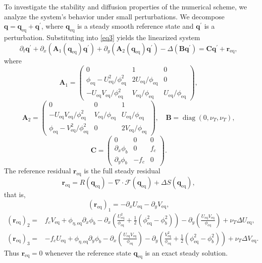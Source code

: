 \documentclass[pdflatex,sn-mathphys-num]{sn-jnl}%
\theoremstyle{thmstyleone}%
\theoremstyle{thmstyletwo}%
\theoremstyle{thmstylethree}%
\begin{document}
To investigate the stability and diffusion properties of the numerical scheme, we analyze the system's behavior under small perturbations. We decompose $\mathbf{q}=\mathbf{q}_{\mathrm{eq}}+\mathbf{q}^\prime$, where $\mathbf{q}_{\mathrm{eq}}$ is a steady smooth reference state and $\mathbf{q}^\prime$ is a perturbation. Substituting into \eqref{eq3} yields the linearized system
\begin{equation}\label{eq12}
\partial_t \mathbf{q}^{\prime}+\partial_x\left(\mathbf{A}_1(\mathbf{q}_{\mathrm{eq}}) \mathbf{q}^{\prime}\right)+\partial_y\left(\mathbf{A}_2(\mathbf{q}_{\mathrm{eq}}) \mathbf{q}^{\prime}\right)-\Delta(\mathbf{B} \mathbf{q}^{\prime}) = \mathbf{C} \mathbf{q}^{\prime}+\mathbf{r}_{\mathrm{eq}} ,
\end{equation}
where
\[
\mathbf A_1=
\begin{pmatrix}
0&1&0\\
\phi_{\mathrm{eq}}-U_{\mathrm{eq}}^2/\phi_{\mathrm{eq}}^2&2U_{\mathrm{eq}}/\phi_{\mathrm{eq}}&0\\
-U_{\mathrm{eq}}V_{\mathrm{eq}}/\phi_{\mathrm{eq}}^2&V_{\mathrm{eq}}/\phi_{\mathrm{eq}}&U_{\mathrm{eq}}/\phi_{\mathrm{eq}}
\end{pmatrix},
\]
\[
\mathbf A_2=
\begin{pmatrix}
0&0&1\\
-U_{\mathrm{eq}}V_{\mathrm{eq}}/\phi_{\mathrm{eq}}^2&V_{\mathrm{eq}}/\phi_{\mathrm{eq}}&U_{\mathrm{eq}}/\phi_{\mathrm{eq}}\\
\phi_{\mathrm{eq}}-V_{\mathrm{eq}}^2/\phi_{\mathrm{eq}}^2&0&2V_{\mathrm{eq}}/\phi_{\mathrm{eq}}
\end{pmatrix},
\quad
\mathbf B=\operatorname{diag}(0,\nu_T,\nu_T),
\]
\[
\mathbf C=
\begin{pmatrix}
0&0&0\\
\partial_x\phi_b&0&f_c\\
\partial_y\phi_b&-f_c&0
\end{pmatrix}.
\]
The reference residual $\mathbf r_{\mathrm{eq}}$ is the full steady residual
\begin{equation}
\label{eq:reference-residual}
\mathbf r_{\mathrm{eq}}
=R(\mathbf q_{\mathrm{eq}})-\nabla\cdot\mathcal F(\mathbf q_{\mathrm{eq}})
+\Delta S(\mathbf q_{\mathrm{eq}}),
\end{equation}
that is,
\[
(\mathbf r_{\mathrm{eq}})_1=-\partial_xU_{\mathrm{eq}}-\partial_yV_{\mathrm{eq}},
\]
\[
\begin{aligned}
(\mathbf r_{\mathrm{eq}})_2={}&f_cV_{\mathrm{eq}}+\phi_{\eta,\mathrm{eq}}\partial_x\phi_b
-\partial_x\left(\frac{U_{\mathrm{eq}}^2}{\phi_{\mathrm{eq}}}
+\frac12(\phi_{\mathrm{eq}}^2-\phi_b^2)\right)
-\partial_y\left(\frac{U_{\mathrm{eq}}V_{\mathrm{eq}}}{\phi_{\mathrm{eq}}}\right)
+\nu_T\Delta U_{\mathrm{eq}},\\
(\mathbf r_{\mathrm{eq}})_3={}&-f_cU_{\mathrm{eq}}+\phi_{\eta,\mathrm{eq}}\partial_y\phi_b
-\partial_x\left(\frac{U_{\mathrm{eq}}V_{\mathrm{eq}}}{\phi_{\mathrm{eq}}}\right)
-\partial_y\left(\frac{V_{\mathrm{eq}}^2}{\phi_{\mathrm{eq}}}
+\frac12(\phi_{\mathrm{eq}}^2-\phi_b^2)\right)
+\nu_T\Delta V_{\mathrm{eq}}.
\end{aligned}
\]
Thus $\mathbf r_{\mathrm{eq}}=0$ whenever the reference state $\mathbf q_{\mathrm{eq}}$ is an exact steady solution.
\end{document}
